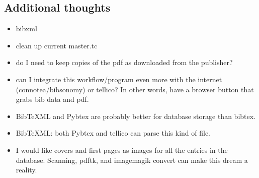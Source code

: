 \documentclass[letterpaper,12pt]{article}
\begin{document}
\subsection{Additional thoughts}

\begin{itemize}
\item bibxml
\item clean up current master.tc
\item do I need to keep copies of the pdf as downloaded from the publisher?
\item can I integrate this workflow/program even more with the internet (connotea/bibsonomy) or tellico? In other words, have a browser button that grabs bib data and pdf.
\item BibTeXML and Pybtex are probably better for database storage than bibtex.
\item BibTeXML: both Pybtex and tellico can parse this kind of file.
\item I would like covers and first pages as images for all the entries in the database. Scanning, pdftk, and imagemagik convert can make this dream a reality.
\end{itemize}
\end{document}
